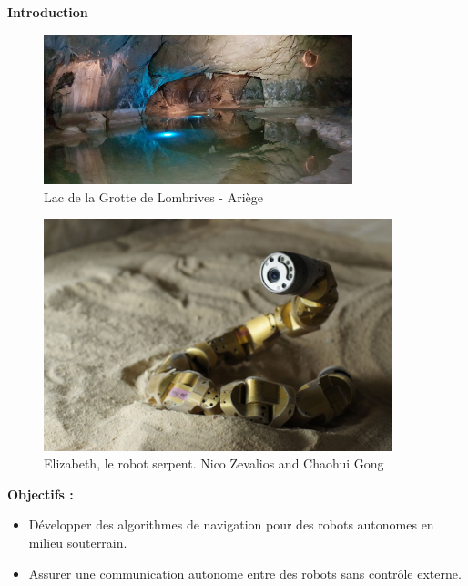 \documentclass[aspectratio=169,10pt]{beamer}
\begin{document}
\begin{frame}{\textbf{Introduction}}

	\begin{minipage}{0.6\linewidth}
		\begin{figure}
			\centering
			\includegraphics[width=0.8\textwidth]{IMAGES/le-lac-des-grottes-lombrives.jpg}
			\caption{Lac de la Grotte de Lombrives - Ariège}
			\label{fig:ariege_cave}
		\end{figure}
	\end{minipage}
	\hfill
	\begin{minipage}{0.35\linewidth}
		\begin{figure}
			\centering
			\includegraphics[width=0.9\textwidth]{IMAGES/Elizabeth.png}
			\caption{Elizabeth, le robot serpent. Nico Zevalios and Chaohui Gong}
			\label{fig:robot_exploration}
		\end{figure}
	\end{minipage}
    
	\textbf{Objectifs :}

	\vspace{0.8em}
	\begin{itemize}
		\item Développer des algorithmes de navigation pour des robots autonomes en milieu souterrain.
		\vspace{0.2cm}
		\item Assurer une communication autonome entre des robots sans contrôle externe.
	\end{itemize}
\end{frame}
\end{document}
